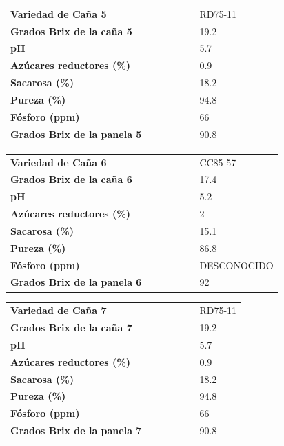 \documentclass{article}%
\begin{document}
\linebreak%
\newline%
%
\linebreak%
\begin{tabular}{lcccccl}%
\textbf{Variedad de Caña 5}& & & & & &RD75{-}11\\%
\textbf{Grados Brix de la caña 5}& & & & & &19.2\\%
\textbf{pH}& & & & & &5.7\\%
\textbf{Azúcares reductores (\%)}& & & & & &0.9\\%
\textbf{Sacarosa (\%)}& & & & & &18.2\\%
\textbf{Pureza (\%)}& & & & & &94.8\\%
\textbf{Fósforo (ppm)}& & & & & &66\\%
\textbf{Grados Brix de la panela 5}& & & & & &90.8\\%
\end{tabular}%
\linebreak%
\newline%
%
\linebreak%
\begin{tabular}{lcccccl}%
\textbf{Variedad de Caña 6}& & & & & &CC85{-}57\\%
\textbf{Grados Brix de la caña 6}& & & & & &17.4\\%
\textbf{pH}& & & & & &5.2\\%
\textbf{Azúcares reductores (\%)}& & & & & &2\\%
\textbf{Sacarosa (\%)}& & & & & &15.1\\%
\textbf{Pureza (\%)}& & & & & &86.8\\%
\textbf{Fósforo (ppm)}& & & & & &DESCONOCIDO\\%
\textbf{Grados Brix de la panela 6}& & & & & &92\\%
\end{tabular}%
\linebreak%
\newline%
%
\linebreak%
\begin{tabular}{lcccccl}%
\textbf{Variedad de Caña 7}& & & & & &RD75{-}11\\%
\textbf{Grados Brix de la caña 7}& & & & & &19.2\\%
\textbf{pH}& & & & & &5.7\\%
\textbf{Azúcares reductores (\%)}& & & & & &0.9\\%
\textbf{Sacarosa (\%)}& & & & & &18.2\\%
\textbf{Pureza (\%)}& & & & & &94.8\\%
\textbf{Fósforo (ppm)}& & & & & &66\\%
\textbf{Grados Brix de la panela 7}& & & & & &90.8\\%
\end{tabular}%
\end{document}
